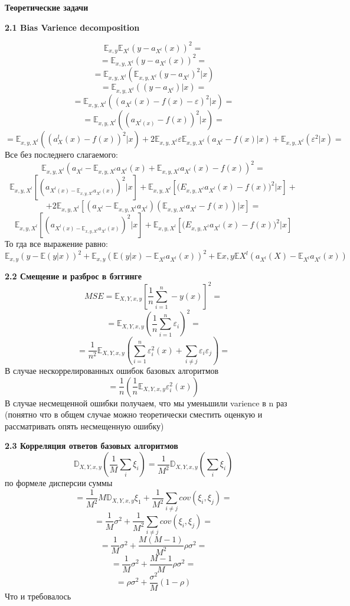 \documentclass[11pt,a4paper]{article}
\newcommand{\eps}{\varepsilon}
\begin{document}
\begin{center}
\Huge {
\noindent
\textbf{Теоретические задачи}
}
\end{center}

\Large {
\textbf {2.1 Bias Varience decomposition}
}

$$\mathbb E_{x, y} \mathbb E_{X^l} (y - a_{X^l}(x))^2 = $$
$$ = \mathbb E_{x, y, X^l}(y - a_{X^l}(x))^2 =$$
$$ = \mathbb E_{x, y, X^l} (\mathbb E_{x, y, X^l} (y - a_{X^l})^2 | x) $$
$$ =\mathbb E_{x, y, X^l} ((y - a_{X^l})|x) = $$
$$ = \mathbb E_{x, y, X^l}((a_{X^l}(x) - f(x) - \eps)^2|x) =$$
$$ = \mathbb E_{x, y, X^l} ((a_{X^l(x)} - f(x))^2|x) = $$
$$ = \mathbb E_{x, y, X^l} ((a_X^l(x) - f(x))^2 |x) + 2 \mathbb E_{x, y, X^l}\eps \mathbb E_{x, y, X^l}(a_{X^l} - f(x)|x) + \mathbb E_{x, y, X^l}(\eps^2|x) = $$
Все без последнего слагаемого:
\\
$$ \mathbb E_{x, y, X^l} (a_{X^l} - \mathbb E_{x, y, X^l}a_{X^l}(x) + \mathbb E_{x, y, X^l} a_{X^l}(x) - f(x))^2 = $$
$$ \mathbb E_{x, y, X^l} [(a_{X^l(x) - \mathbb E_{x, y, X^l}a_{X^l}(x)})^2|x] + \mathbb E_{x, y, X^l}[\mathbb (E_{x, y, X^l} a_{X^l}(x) - f(x))^2|x]+$$
$$+ 2\mathbb E_{x, y, X^l} [(a_{X^l} - \mathbb E_{x, y, X^l}a_{X^l}) (\mathbb E_{x, y, X^l} a_{X^l} - f(x))|x]=$$
$$ \mathbb E_{x, y, X^l} [(a_{X^l(x) - \mathbb E_{x, y, X^l}a_{X^l}(x)})^2|x] + \mathbb E_{x, y, X^l}[\mathbb (E_{x, y, X^l} a_{X^l}(x) - f(x))^2|x]$$
То гда все выражение равно:
\\
$$\mathbb E_{x, y} (y - \mathbb E(y|x))^2 + \mathbb E_{x, y} (\mathbb E(y|x) - \mathbb E_{X^l}a_{X^l}(x))^2 + \mathbb E{x, y}\mathbb E{X^l}(a_{X^l}(X) - \mathbb E_{X^l}a_{X^l}(x))$$

\Large {
\textbf {2.2 Смещение и разброс в бэггинге}
}
$$ MSE = \mathbb E_{X, Y, x, y} [\frac{1}{n} \sum_{i = 1}^{n} - y(x)]^2 = $$
$$ = \mathbb E_{X, Y, x, y} (\frac{1}{n} \sum_{i = 1}^n \eps_i)^2 = $$
$$ = \frac{1}{n^2} \mathbb E_{X, Y, x, y} (\sum_{i=1}^n \eps_i^2(x) + \sum_{i \ne j} \eps_i \eps_j )= $$
В случае нескоррелированных ошибок базовых алгоритмов
$$ = \frac{1}{n} (\frac{1}{n} \mathbb E_{X, Y, x, y} \eps_i^2(x)) $$
В случае несмещенной ошибки получаем, что мы уменьшили varience в n раз (понятно что в общем случае можно теоретически сместить оценкую и рассматривать опять несмещенную ошибку)

\Large {
\textbf {2.3 Корреляция ответов базовых алгоритмов}
}
$$ \mathbb D_{X, Y, x, y} (\frac{1}{M} \sum_i \xi_i)= \frac{1}{M^2} \mathbb D_{X, Y, x, y} (\sum_i \xi_i)$$ по формеле дисперсии суммы
$$ = \frac{1}{M^2} M \mathbb D_{X, Y, x, y} \xi_1 + \frac{1}{M^2} \sum_{i \ne j} cov(\xi_i, \xi_j)=$$
$$ = \frac{1}{M} \sigma^2 + \frac{1}{M^2} \sum_{i \ne j} cov(\xi_i, \xi_j) =$$
$$ = \frac{1}{M} \sigma^2 + \frac{M(M - 1)}{M^2} \rho \sigma^2 = $$
$$ = \frac{1}{M} \sigma^2 + \frac{M - 1}{M} \rho \sigma^2 = $$
$$ = \rho \sigma^2 + \frac{\sigma^2}{M}(1 - \rho) $$
Что и требовалось
\end{document}
